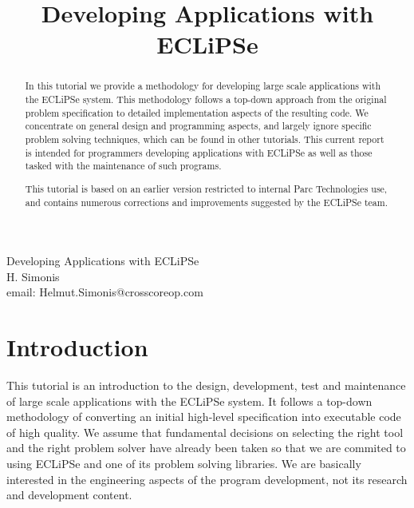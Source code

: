 \documentclass[a4paper,12pt]{report}
\title{#2}
\newcommand{\techReport}[3]{
\thispagestyle{empty}
\begin{center}\fbox{\large TECHNICAL REPORT IC-PARC-#1}\end{center}
\vspace{120pt}
\begin{center}
\huge #2
\vspace{24pt} \\
\large #3
\end{center}
\vspace{\fill}
\newpage
\title{#2}
}
\begin{document}
\techReport{03-2}{Developing Applications with ECLiPSe}{H. Simonis\\
email: Helmut.Simonis@crosscoreop.com\\
}

\begin{abstract}
In this tutorial we provide a methodology for developing large scale 
applications with the ECLiPSe system. This methodology follows a top-down 
approach from the original problem specification to detailed implementation 
aspects of the resulting code. We concentrate on general design and 
programming aspects, and largely ignore specific problem solving 
techniques, which can be found in other tutorials. This current report 
is intended for programmers developing applications with ECLiPSe 
as well as those tasked with the maintenance of such programs.

This tutorial is based on an earlier version restricted to internal Parc Technologies use, and contains numerous corrections and improvements suggested by the ECLiPSe team. 
\end{abstract}
\pagestyle{headings}
\tableofcontents
\newpage
\chapter{Introduction}
\label{introduction}

This tutorial is an introduction to the design, development, test and maintenance of large scale applications with the ECLiPSe system. It follows a top-down methodology of converting an initial high-level specification into executable code of high quality. We assume that fundamental decisions on selecting the right tool and the right problem solver have already been taken so that we are commited to using ECLiPSe and one of its problem solving libraries. We are basically interested in the engineering aspects of the program development, not its research and development content.
\end{document}
